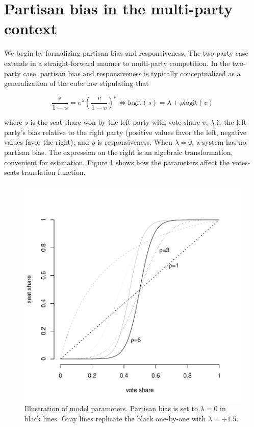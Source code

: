 \documentclass[letter,12pt]{article}
\begin{document}
\section{Partisan bias in the multi-party context}

We begin by formalizing partisan bias and responsiveness. The two-party case \citep{taagepera.CubeLaw.1973,tufte1973seatsVotes,king.browning1987biasRespUS} extends in a straight-forward manner to multi-party competition. In the two-party case, partisan bias and responsiveness is typically conceptualized as a generalization of the cube law stipulating that 

\begin{equation}\label{E:kingBi}
 \frac{s}{1-s} = e^\lambda  \left(\frac{v}{1-v}\right)^\rho \iff
 \text{logit}(s) = \lambda + \rho  \text{logit}(v)
\end{equation}\label{E:cubeLaw}

\noindent where $s$ is the seat share won by the left party with vote share $v$; $\lambda$ is the left party's bias relative to the right party (positive values favor the left, negative values favor the right); and $\rho$ is responsiveness. When $\lambda=0$, a system has no partisan bias. The expression on the right is an algebraic transformation, convenient for estimation. Figure \ref{F:lambdaRhoEx} shows how the parameters affect the votes-seats translation function. 


\begin{figure}
\begin{center}
    \includegraphics[width=.55\columnwidth]{rhoExample.pdf} 
\caption{Illustration of model parameters. Partisan bias is set to $\lambda=0$ in black lines. Gray lines replicate the black one-by-one with $\lambda=+1.5$.}\label{F:lambdaRhoEx}
\end{center}
\end{figure}
\end{document}
